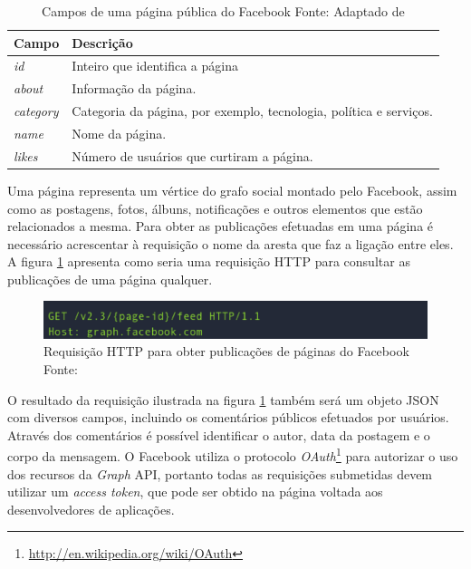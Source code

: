 \begin{table}[!ht]
\begin{center}
  \begin{tabular}{|p{5cm}|p{7cm}|}
	\hline
	Campo & Descrição
	\\ \hline
	\textit{id} &  Inteiro que identifica a página
	\\ \hline
	\textit{about} & Informação da página.
	\\ \hline
	\textit{category} & Categoria da página, por exemplo, tecnologia, política e serviços.
	\\ \hline
	\textit{name} & Nome da página.
	\\ \hline
	\textit{likes} & Número de usuários que curtiram a página.
	\\ \hline
  \end{tabular}
  \captionsetup{justification=centering}
  \caption[Campos de uma página pública do Facebook]{Campos de uma página pública do Facebook
  \protect\linebreak Fonte: Adaptado de \cite{facebook-page-doc}}
\label{tab-fb-campos}
\end{center}
\end{table}
\FloatBarrier

Uma página representa um vértice do grafo social montado pelo Facebook, assim como as postagens, fotos, álbuns, notificações e outros elementos que estão relacionados a mesma. Para obter as publicações efetuadas em uma página é necessário acrescentar à requisição o nome da aresta que faz a ligação entre eles. A figura \ref{facebook-rest} apresenta como seria uma requisição HTTP para consultar as publicações de uma página qualquer.

\begin{figure}[ht!]
	\centering
	\includegraphics[keepaspectratio=true,scale=0.35]
	  {figuras/fb-http.eps}
	\caption[Requisição HTTP para obter publicações de páginas do Facebook]{Requisição HTTP para obter publicações de páginas do Facebook
	\protect\linebreak Fonte: \cite{facebook-page-doc}}
	\label{facebook-rest}
\end{figure}
\FloatBarrier

O resultado da requisição ilustrada na figura \ref{facebook-rest} também será um objeto JSON com diversos campos, incluindo os comentários públicos efetuados por usuários. Através dos comentários é possível identificar o autor, data da postagem e o corpo da mensagem. O Facebook utiliza o protocolo \textit{OAuth}\footnote{\url{http://en.wikipedia.org/wiki/OAuth}} para autorizar o uso dos recursos da \textit{Graph} API, portanto todas as requisições submetidas devem utilizar um \textit{access token}, que pode ser obtido na página voltada aos desenvolvedores de aplicações.

